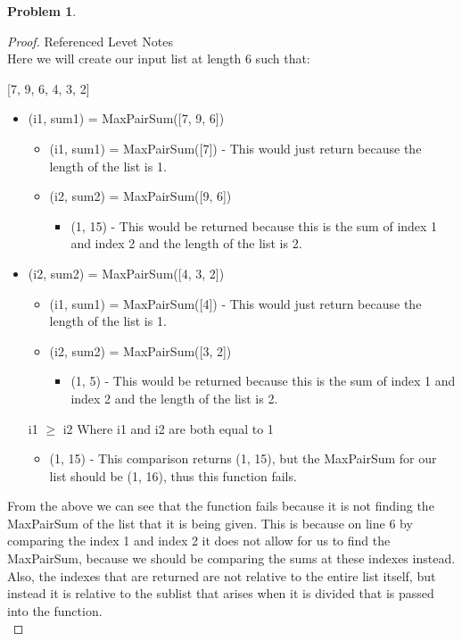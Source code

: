 \documentclass[11pt]{article}
\theoremstyle{definition}
\theoremstyle{definition}
\newtheorem{required}{Problem}
\theoremstyle{definition}
\begin{document}
\begin{required}
\begin{proof} Referenced Levet Notes\\ 
Here we will create our input list at length 6 such that: \\
\begin{center}
[7, 9, 6, 4, 3, 2]
\end{center}
\begin{itemize}
\item (i1, sum1) = MaxPairSum([7, 9, 6])
\begin{itemize}
\item (i1, sum1) = MaxPairSum([7]) - This would just return because the length of the list is 1.
\item (i2, sum2) = MaxPairSum([9, 6])
\begin{itemize}
\item (1, 15) - This would be returned because this is the sum of index 1 and index 2 and the length of the list is 2.
\end{itemize}
\end{itemize}
\item(i2, sum2) = MaxPairSum([4, 3, 2])
\begin{itemize}
\item (i1, sum1) = MaxPairSum([4])  - This would just return because the length of the list is 1.
\item (i2, sum2) = MaxPairSum([3, 2])
\begin{itemize}
\item (1, 5) - This would be returned because this is the sum of index 1 and index 2 and the length of the list is 2.
\end{itemize}
\end{itemize}
i1 $\geq$ i2 Where i1 and i2 are both equal to 1 
\begin{itemize}
\item (1, 15) - This comparison returns (1, 15), but the MaxPairSum for our list should be (1, 16), thus this function fails.
\end{itemize}
\end{itemize}
From the above we can see that the function fails because it is not finding the MaxPairSum of the list that it is being given. This is because on line 6 by comparing the index 1 and index 2 it does not allow for us to find the MaxPairSum, because we should be comparing the sums at these indexes instead. \\

Also, the indexes that are returned are not relative to the entire list itself, but instead it is relative to the sublist that arises when it is divided that is passed into the function. \\


\end{proof}
\end{required}
\end{document}

